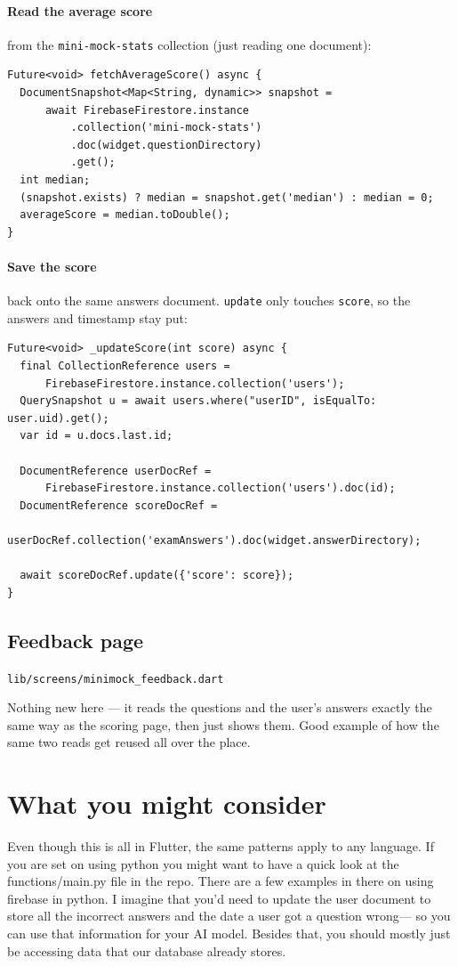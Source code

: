 \documentclass[11pt,a4paper]{article}
\newcommand{\file}[1]{\texttt{\small #1}}
\begin{document}
\paragraph{Read the average score} from the \texttt{mini-mock-stats} collection
(just reading one document):

\begin{lstlisting}
Future<void> fetchAverageScore() async {
  DocumentSnapshot<Map<String, dynamic>> snapshot =
      await FirebaseFirestore.instance
          .collection('mini-mock-stats')
          .doc(widget.questionDirectory)
          .get();
  int median;
  (snapshot.exists) ? median = snapshot.get('median') : median = 0;
  averageScore = median.toDouble();
}
\end{lstlisting}

\paragraph{Save the score} back onto the same answers document. \verb|update|
only touches \verb|score|, so the answers and timestamp stay put:

\begin{lstlisting}
Future<void> _updateScore(int score) async {
  final CollectionReference users =
      FirebaseFirestore.instance.collection('users');
  QuerySnapshot u = await users.where("userID", isEqualTo: user.uid).get();
  var id = u.docs.last.id;

  DocumentReference userDocRef =
      FirebaseFirestore.instance.collection('users').doc(id);
  DocumentReference scoreDocRef =
      userDocRef.collection('examAnswers').doc(widget.answerDirectory);

  await scoreDocRef.update({'score': score});
}
\end{lstlisting}

\subsection{Feedback page}
\file{lib/screens/minimock\_feedback.dart}

Nothing new here --- it reads the questions and the user's answers exactly the
same way as the scoring page, then just shows them. Good example of how the same
two reads get reused all over the place.


\section{What you might consider}
Even though this is all in Flutter, the same patterns apply to any language. If you are set on using python you might want to have a quick look at the 
functions/main.py file in the repo. There are a few examples in there on using firebase in python. I imagine that you'd need to 
update the user document to store all the incorrect answers and the date a user got a question wrong--- so you can use that information 
for your AI model. Besides that, you should mostly just be accessing data that our database already stores. 
\end{document}
